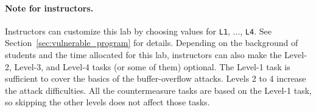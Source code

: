 \paragraph{Note for instructors.}
Instructors can customize this lab by choosing values
for \texttt{L1}, ..., \texttt{L4}. See
Section~\ref{sec:vulnerable_program} for details.
Depending on the background of students and the time allocated
for this lab, instructors can also make the
Level-2, Level-3, and Level-4 tasks (or some of them) optional.
The Level-1 task is sufficient to cover the basics of
the buffer-overflow attacks. Levels 2 to 4
increase the attack difficulties.
All the countermeasure tasks are based on the Level-1 task,
so skipping the other levels does not affect those tasks.


